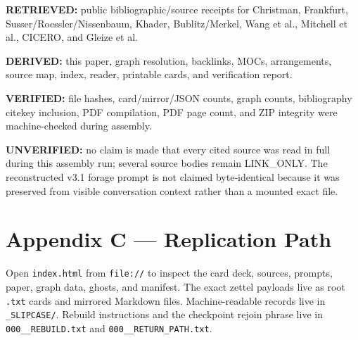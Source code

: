 \documentclass[
  10pt,
]{article}
\begin{document}
\textbf{RETRIEVED:} public bibliographic/source receipts for Christman,
Frankfurt, Susser/Roessler/Nissenbaum, Khader, Bublitz/Merkel, Wang et
al., Mitchell et al., CICERO, and Gleize et al.

\textbf{DERIVED:} this paper, graph resolution, backlinks, MOCs,
arrangements, source map, index, reader, printable cards, and
verification report.

\textbf{VERIFIED:} file hashes, card/mirror/JSON counts, graph counts,
bibliography citekey inclusion, PDF compilation, PDF page count, and ZIP
integrity were machine-checked during assembly.

\textbf{UNVERIFIED:} no claim is made that every cited source was read
in full during this assembly run; several source bodies remain
LINK\_ONLY. The reconstructed v3.1 forage prompt is not claimed
byte-identical because it was preserved from visible conversation
context rather than a mounted exact file.

\section{Appendix C --- Replication
Path}\label{appendix-c-replication-path}

Open \texttt{index.html} from \texttt{file://} to inspect the card deck,
sources, prompts, paper, graph data, ghosts, and manifest. The exact
zettel payloads live as root \texttt{.txt} cards and mirrored Markdown
files. Machine-readable records live in \texttt{\_SLIPCASE/}. Rebuild
instructions and the checkpoint rejoin phrase live in
\texttt{000\_\_REBUILD.txt} and \texttt{000\_\_RETURN\_PATH.txt}.
\end{document}
